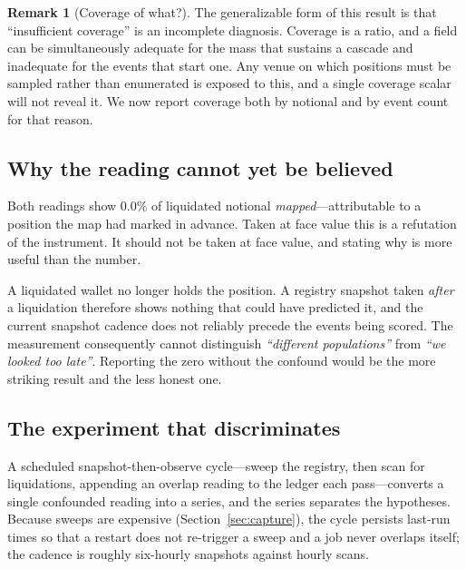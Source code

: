 \documentclass[11pt,a4paper]{article}
\theoremstyle{definition}
\newtheorem{remark}{Remark}[section]
\theoremstyle{plain}
\begin{document}
\begin{remark}[Coverage of what?]
\label{rem:coverage_of_what}
The generalizable form of this result is that ``insufficient coverage'' is an incomplete diagnosis.
Coverage is a ratio, and a field can be simultaneously adequate for the mass that sustains a cascade
and inadequate for the events that start one. Any venue on which positions must be sampled rather
than enumerated is exposed to this, and a single coverage scalar will not reveal it. We now report
coverage both by notional and by event count for that reason.
\end{remark}

\subsection{Why the reading cannot yet be believed}

Both readings show $0.0\%$ of liquidated notional \emph{mapped}---attributable to a position the map
had marked in advance. Taken at face value this is a refutation of the instrument. It should not be
taken at face value, and stating why is more useful than the number.

A liquidated wallet no longer holds the position. A registry snapshot taken \emph{after} a
liquidation therefore shows nothing that could have predicted it, and the current snapshot cadence
does not reliably precede the events being scored. The measurement consequently cannot distinguish
\emph{``different populations''} from \emph{``we looked too late''}. Reporting the zero without the
confound would be the more striking result and the less honest one.

\subsection{The experiment that discriminates}

A scheduled snapshot-then-observe cycle---sweep the registry, then scan for liquidations, appending
an overlap reading to the ledger each pass---converts a single confounded reading into a series, and
the series separates the hypotheses. Because sweeps are expensive (Section~\ref{sec:capture}), the
cycle persists last-run times so that a restart does not re-trigger a sweep and a job never overlaps
itself; the cadence is roughly six-hourly snapshots against hourly scans.
\end{document}
